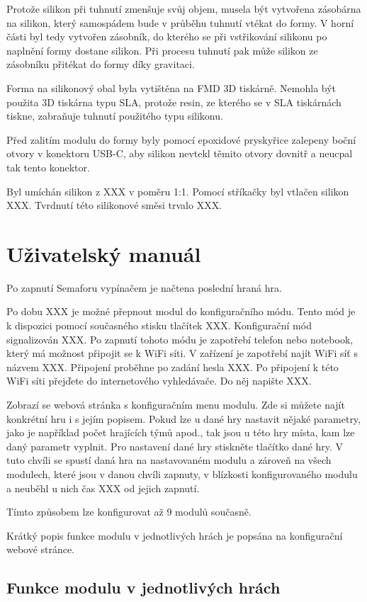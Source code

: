 Protože silikon při tuhnutí zmenšuje svůj objem, musela být vytvořena zásobárna na silikon, který samospádem bude v průběhu tuhnutí vtékat do formy. V horní části byl tedy vytvořen zásobník, do kterého 
se při vstřikování silikonu po naplnění formy dostane silikon. Při procesu tuhnutí pak může silikon ze zásobníku přitékat do formy díky gravitaci. 

Forma na silikonový obal byla vytištěna na FMD 3D tiskárně. Nemohla být použita 3D tiskárna typu SLA, protože resin, ze kterého se v SLA tiskárnách tiskne, zabraňuje tuhnutí použitého typu silikonu. 

Před zalitím modulu do formy byly pomocí epoxidové pryskyřice zalepeny boční otvory v konektoru USB-C, aby silikon nevtekl těmito otvory dovnitř a neucpal tak tento konektor. 

Byl umíchán silikon z XXX v poměru 1:1. Pomocí stříkačky byl vtlačen silikon XXX. 
Tvrdnutí této silikonové směsi trvalo XXX. 


\chapter{Uživatelský manuál}
Po zapnutí Semaforu vypínačem je načtena poslední hraná hra. 

Po dobu XXX je možné přepnout modul do konfiguračního módu. Tento mód je k dispozici pomocí současného stisku tlačítek XXX. Konfigurační mód signalizován XXX. Po zapnutí tohoto módu je zapotřebí telefon 
nebo notebook, který má možnost připojit se k WiFi síti. V zařízení je zapotřebí najít WiFi síť s názvem XXX. Připojení proběhne po zadání hesla XXX. Po připojení k této WiFi síti přejďete do internetového 
vyhledávače. Do něj napište XXX. 

Zobrazí se webová stránka s konfiguračním menu modulu. Zde si můžete najít konkrétní hru i s jejím popisem. Pokud lze u dané hry nastavit nějaké parametry, jako je například počet hrajících týmů apod., tak 
jsou u této hry místa, kam lze daný parametr vyplnit. Pro nastavení dané hry stiskněte tlačítko dané hry. V tuto chvíli se spustí daná hra na nastavovaném modulu a zároveň na všech modulech, které jsou v danou
chvíli zapnuty, v blízkosti konfigurovaného modulu a neuběhl u nich čas XXX od jejich zapnutí. 

Tímto způsobem lze konfigurovat až 9 modulů současně. 

Krátký popis funkce modulu v jednotlivých hrách je popsána na konfigurační webové stránce. 

\section{Funkce modulu v jednotlivých hrách}





